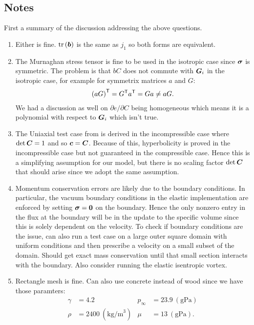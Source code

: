 \documentclass{article}
\begin{document}
\subsection{Notes}
First a summary of the discussion addressing the above questions.
\begin{enumerate}
   \item Either is fine. $\operatorname{tr}\left({\boldsymbol b}\right)$ is the same as $j_1$ so both forms are equivalent.
   \item The Murnaghan stress tensor is fine to be used in the isotropic case since ${\boldsymbol \sigma}$ is symmetric. The problem is that $bC$ does not commute with ${\boldsymbol G}_i$ in the isotropic case, 
   for example for symmetrix matrices $a$ and $G$:
   \begin{align*}
      \left(aG\right)^{\mathsf T} = G^{\mathsf T} a^{\mathsf T} = Ga \neq aG.
   \end{align*} 
   We had a discussion as well on $\partial e / \partial C$ being homogeneous which means it is a polynomial with respect to ${\boldsymbol G}_i$ which isn't true.
   \item The Uniaxial test case from \cite{chaimoon2019} is derived in the incompressible case where $\det {\boldsymbol C} = 1$ and so ${\boldsymbol c} = {\boldsymbol C}$.
   Because of this, hyperbolicity is proved in the incompressible case but not guaranteed in the compressible case.
   Hence this is a simplifying assumption for our model, but there is no scaling factor $\det {\boldsymbol C}$ that should arise since we adopt the same assumption.
   \item Momentum conservation errors are likely due to the boundary conditions.  
   In particular, the vacuum boundary conditions in the elastic implementation are enforced by setting ${\boldsymbol \sigma} = {\boldsymbol 0}$ on the boundary. 
   Hence the only nonzero entry in the flux at the boundary will be in the update to the specific volume since this is solely dependent on the velocity.
   To check if boundary conditions are the issue, can also run a test case on a large outer square domain with uniform conditions and then prescribe a velocity on a small subset of the domain. 
   Should get exact mass conservation until that small section interacts with the boundary.
   Also consider running the elastic isentropic vortex.
   \item Rectangle mesh is fine. Can also use concrete instead of wood since we have those paramters:
   \begin{align*}
      \gamma &= 4.2 &   p_{\infty} &= 23.9\ (\text{gPa}) \\
      \rho &= 2400\ (\text{kg/m}^3) & \mu &= 13\ (\text{gPa}). \\
   \end{align*}
\end{enumerate}
\end{document}
